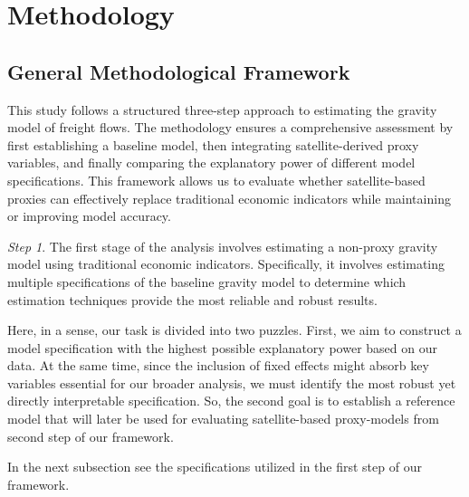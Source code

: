 \section{Methodology} 
\label{sec: method}

\subsection{General Methodological Framework}

This study follows a structured three-step approach to estimating the gravity model of freight flows. The methodology ensures a comprehensive assessment by first establishing a baseline model, then integrating satellite-derived proxy variables, and finally comparing the explanatory power of different model specifications. This framework allows us to evaluate whether satellite-based proxies can effectively replace traditional economic indicators while maintaining or improving model accuracy.

\textit{Step 1}. The first stage of the analysis involves estimating a non-proxy gravity model using traditional economic indicators. Specifically, it involves estimating multiple specifications of the baseline gravity model to determine which estimation techniques provide the most reliable and robust results. 

Here, in a sense, our task is divided into two puzzles. First, we aim to construct a model specification with the highest possible explanatory power based on our data. At the same time, since the inclusion of fixed effects might absorb key variables essential for our broader analysis, we must identify the most robust yet directly interpretable specification. So, the second goal is to establish a reference model that will later be used for evaluating satellite-based proxy-models from second step of our framework.

In the next subsection see the specifications utilized in the first step of our framework.




